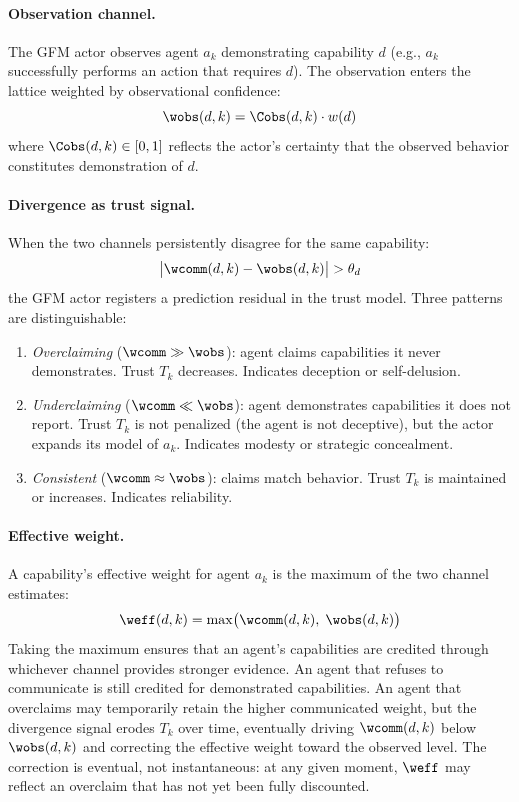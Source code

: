 \paragraph{Observation channel.} The GFM actor observes agent $a_k$
demonstrating capability $d$ (e.g., $a_k$ successfully performs an action that
requires $d$). The observation enters the lattice weighted by observational
confidence:
\begin{equation}
\label{eq:w_obs}
\wobs(d, k) = \Cobs(d, k) \cdot w(d)
\end{equation}
where $\Cobs(d, k) \in [0, 1]$ reflects the actor's certainty that the
observed behavior constitutes demonstration of $d$.

\paragraph{Divergence as trust signal.} When the two channels persistently
disagree for the same capability:
\begin{equation}
\label{eq:divergence}
\bigl|\wcomm(d, k) - \wobs(d, k)\bigr| > \theta_d
\end{equation}
the GFM actor registers a prediction residual in the trust model. Three
patterns are distinguishable:

\begin{enumerate}
\item \emph{Overclaiming} ($\wcomm \gg \wobs$): agent claims capabilities it
  never demonstrates. Trust $T_k$ decreases. Indicates deception or
  self-delusion.
\item \emph{Underclaiming} ($\wcomm \ll \wobs$): agent demonstrates
  capabilities it does not report. Trust $T_k$ is not penalized (the agent is
  not deceptive), but the actor expands its model of $a_k$. Indicates modesty
  or strategic concealment.
\item \emph{Consistent} ($\wcomm \approx \wobs$): claims match behavior.
  Trust $T_k$ is maintained or increases. Indicates reliability.
\end{enumerate}

\paragraph{Effective weight.} A capability's effective weight for agent $a_k$
is the maximum of the two channel estimates:
\begin{equation}
\label{eq:w_eff}
\weff(d, k) = \max\bigl(\wcomm(d, k),\; \wobs(d, k)\bigr)
\end{equation}
Taking the maximum ensures that an agent's capabilities are credited through
whichever channel provides stronger evidence. An agent that refuses to
communicate is still credited for demonstrated capabilities. An agent that
overclaims may temporarily retain the higher communicated weight, but the
divergence signal erodes $T_k$ over time, eventually driving $\wcomm(d, k)$
below $\wobs(d, k)$ and correcting the effective weight toward the observed
level. The correction is eventual, not instantaneous: at any given moment,
$\weff$ may reflect an overclaim that has not yet been fully discounted.

